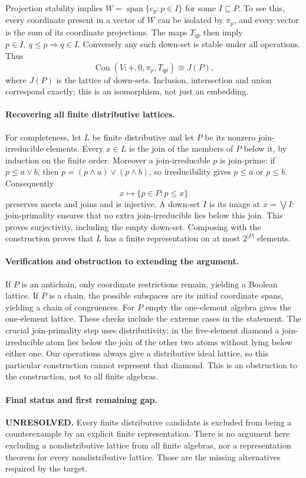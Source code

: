 \documentclass[11pt,a4paper]{article}
\begin{document}
Projection stability implies
$W=\operatorname{span}\{e_p:p\in I\}$ for some $I\subseteq P$.
To see this, every coordinate present in a vector of $W$ can be isolated
by $\pi_p$, and every vector is the sum of its coordinate projections.
The maps $T_{qp}$ then imply $p\in I,\ q\le p\Rightarrow q\in I$.
Conversely any such down-set is stable under all operations. Thus
\[
 \operatorname{Con}(V;+,0,\pi_p,T_{qp})\cong J(P),
\]
where $J(P)$ is the lattice of down-sets. Inclusion, intersection and
union correspond exactly; this is an isomorphism, not just an embedding.

\paragraph{Recovering all finite distributive lattices.}
For completeness, let $L$ be finite distributive and let $P$ be its
nonzero join-irreducible elements. Every $x\in L$ is the join of the
members of $P$ below it, by induction on the finite order. Moreover a
join-irreducible $p$ is join-prime: if $p\le a\vee b$, then
$p=(p\wedge a)\vee(p\wedge b)$, so irreducibility gives $p\le a$ or
$p\le b$. Consequently
\[
 x\longmapsto\{p\in P:p\le x\}
\]
preserves meets and joins and is injective. A down-set $I$ is its image
at $x=\bigvee I$: join-primality ensures that no extra join-irreducible
lies below this join. This proves surjectivity, including the empty
down-set. Composing with the construction proves that $L$ has a finite
representation on at most $2^{|P|}$ elements.

\paragraph{Verification and obstruction to extending the argument.}
If $P$ is an antichain, only coordinate restrictions remain, yielding a
Boolean lattice. If $P$ is a chain, the possible subspaces are its initial
coordinate spans, yielding a chain of congruences. For $P$ empty the
one-element algebra gives the one-element lattice. These checks include
the extreme cases in the statement. The crucial join-primality step
uses distributivity: in the five-element diamond a join-irreducible
atom lies below the join of the other two atoms without lying below
either one. Our operations always give a distributive ideal lattice,
so this particular construction cannot represent that diamond. This is
an obstruction to the construction, not to all finite algebras.

\paragraph{Final status and first remaining gap.}
\textbf{UNRESOLVED.} Every finite distributive candidate is excluded
from being a counterexample by an explicit finite representation.
There is no argument here excluding a nondistributive lattice from all
finite algebras, nor a representation theorem for every nondistributive
lattice. Those are the missing alternatives required by the target.
\end{document}
